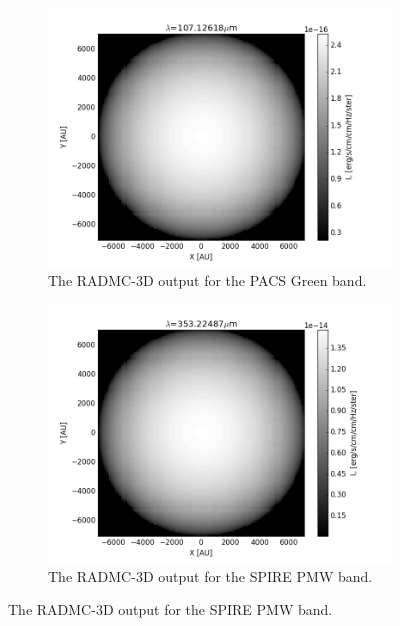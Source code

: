 \documentclass{report}
\begin{document}
\begin{figure}
\begin{subfigure}[b]{.45\linewidth}
\includegraphics[width=\linewidth]{../img/output/green.png}
\caption{The RADMC-3D output for the PACS Green band.}\label{fig:iso-green}
\end{subfigure}
\begin{subfigure}[b]{.45\linewidth}
\includegraphics[width=\linewidth]{../img/output/pmw.png}
\caption{The RADMC-3D output for the SPIRE PMW band.}\label{fig:iso-pmw}
\end{subfigure}


\end{figure}
\end{document}
